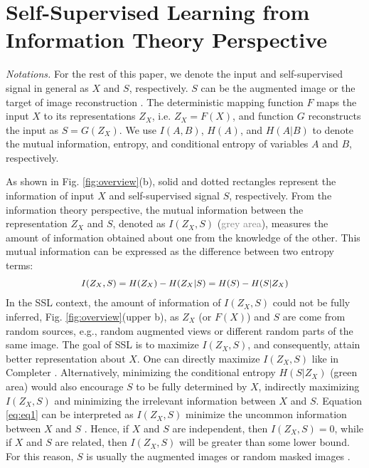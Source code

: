 \documentclass[10pt,twocolumn,letterpaper]{article}
\begin{document}
\section{Self-Supervised Learning from Information Theory Perspective}
\textcolor{nblue}{\textit{Notations.}} For the rest of this paper, we denote the input and self-supervised signal in general as $X$ and $S$, respectively. $S$ can be the augmented image \cite{simclr,moco,dino} or the target of image reconstruction \cite{mae,simmim,beit}. The deterministic mapping function $F$ maps the input $X$ to its representations $Z_X$, i.e. $Z_X = F(X)$, and function $G$ reconstructs the input as $S = G(Z_X)$. We use $I(A,B)$, $H(A)$, and $H(A|B)$ to denote the mutual information, entropy, and conditional entropy of variables $A$ and $B$, respectively.

As shown in Fig. \ref{fig:overview}(b), solid and dotted rectangles represent the information of input $X$ and self-supervised signal $S$, respectively. From the information theory perspective, the mutual information between the representation $Z_X$ and $S$, denoted as $I(Z_X,S)$ (\textcolor{gray}{grey area}), measures the amount of information obtained about one from the knowledge of the other. This mutual information can be expressed as the difference between two entropy terms:
\begin{equation}\label{eq:eq1}
\small
\begin{aligned}
    I(Z_X,S) = H(Z_X) - H(Z_X|S) = H(S) - H(S|Z_X)
\end{aligned}
\end{equation}
In the SSL context, the amount of information of $I(Z_X,S)$ could not be fully inferred, Fig. \ref{fig:overview}(upper b), as $Z_X$ (or $F(X)$) and $S$ are come from random sources, e.g., random augmented views or different random parts of the same image. The goal of SSL is to maximize $I(Z_X,S)$, and consequently, attain better representation about $X$. One can directly maximize $I(Z_X,S)$ like in Completer \cite{completer}. Alternatively, minimizing the conditional entropy $H(S|Z_X)$ (green area) \cite{moco,ssl2} would also encourage $S$ to be fully determined by $X$, indirectly maximizing $I(Z_X,S)$ and minimizing the irrelevant information between $X$ and $S$. Equation \eqref{eq:eq1} can be interpreted as $I(Z_X,S)$ minimize the uncommon information between $X$ and $S$ \cite{morency,twins}. Hence, if $X$ and $S$ are independent, then $I(Z_X,S) = 0$, while if $X$ and $S$ are related, then $I(Z_X,S)$ will be greater than some lower bound. For this reason, $S$ is usually the augmented images \cite{simclr,moco,byol,dino,twins,morency,data2vec} or random masked images \cite{mae,simmim,beit,data2vec}.
\end{document}
